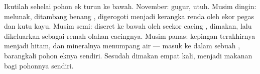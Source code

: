 \begin{example}\label{ex:g6:decomposers-and-soil:leaf}
Ikutilah sehelai  pohon ek turun ke bawah. November: gugur, utuh.
Musim dingin: melunak, ditambang benang , digerogoti menjadi
kerangka renda oleh ekor pegas dan kutu kayu. Musim semi: diseret ke
bawah  oleh seekor cacing , dimakan, lalu dikeluarkan
sebagai remah olahan cacingnya. Musim panas: kepingan terakhirnya
menjadi  hitam, dan mineralnya menumpang air  --- masuk ke
dalam sebuah , barangkali  pohon eknya sendiri. Sesudah
dimakan empat kali,  menjadi makanan bagi pohonnya sendiri.
\end{example}

